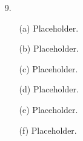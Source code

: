 \documentclass[11pt]{article}
\begin{document}
\begin{itemize}
    \item[9.]
        \begin{itemize}
            \item[(a)]
                Placeholder.

            \item[(b)]
                Placeholder.

            \item[(c)]
                Placeholder.

            \item[(d)]
                Placeholder.

            \item[(e)]
                Placeholder.

            \item[(f)]
                Placeholder.
        \end{itemize}
\end{itemize}

\end{document}
